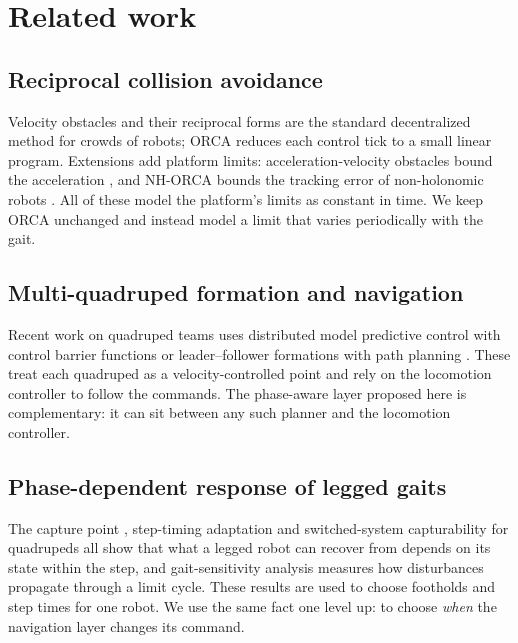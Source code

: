 \documentclass[pdflatex,sn-mathphys-num]{sn-jnl}
\begin{document}
\section{Related work}\label{sec:related}

\subsection{Reciprocal collision avoidance}
Velocity obstacles and their reciprocal forms
\cite{vandenberg2008rvo,vandenberg2011orca} are the standard decentralized method for crowds of robots;
ORCA reduces each control tick to a small linear program. Extensions add platform limits:
acceleration-velocity obstacles bound the acceleration \cite{vandenberg2011avo}, and NH-ORCA bounds the
tracking error of non-holonomic robots \cite{alonsomora2013nhorca}. All of these model the platform's
limits as constant in time. We keep ORCA unchanged and instead model a limit that varies periodically with
the gait.

\subsection{Multi-quadruped formation and navigation}
Recent work on quadruped teams uses distributed model
predictive control with control barrier functions \cite{zhan2025safe} or leader--follower formations with
path planning \cite{noren2026role}. These treat each quadruped as a velocity-controlled point and rely on
the locomotion controller to follow the commands. The phase-aware layer proposed here is complementary: it
can sit between any such planner and the locomotion controller.

\subsection{Phase-dependent response of legged gaits}
The capture point \cite{pratt2006capture}, step-timing
adaptation \cite{khadiv2016step} and switched-system capturability for quadrupeds
\cite{chen2022capturability} all show that what a legged robot can recover from depends on its state
within the step, and gait-sensitivity analysis \cite{hobbelen2007gsn} measures how disturbances propagate
through a limit cycle. These results are used to choose footholds and step times for one robot. We use the
same fact one level up: to choose \emph{when} the navigation layer changes its command.
\end{document}
